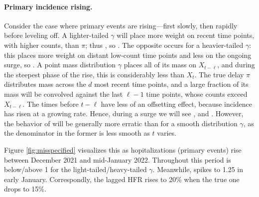 \documentclass{article}
\begin{document}
\paragraph{Primary incidence rising.} 

Consider the case where primary events are rising---first slowly, then rapidly
before leveling off. A lighter-tailed $\gamma$ will place more weight
on recent time points, with higher counts, than $\pi$; thus , so . The opposite occurs for a heavier-tailed $\gamma$: this
places more weight on distant low-count time points and less on the ongoing
surge, so . A point mass distribution $\gamma$ places
all of its mass on $X_{t-\ell}$, and during the steepest phase of the rise, this
is considerably less than $X_t$. The true delay $\pi$ distributes mass across
the  $d$ most recent time points, and a large fraction of its mass will be
convolved against the last $\ell-1$ time points, whose counts exceed
$X_{t-\ell}$. The times before $t-\ell$ have less of an offsetting effect, 
because incidence has risen at a  growing rate. Hence, during a surge we will 
see , and . However, the behavior of  will be generally more
erratic than  for a smooth distribution $\gamma$, as the
denominator in the former is less smooth as $t$ varies. 

Figure \ref{fig:misspecified} visualizes this as hopitalizations (primary
events) rise between December 2021 and mid-January 2022. Throughout this period
 is below/above 1 for the light-tailed/heavy-tailed
$\gamma$. Meanwhile,  spikes to 1.25 in early January.  
Correspondly, the lagged HFR rises to 20\% when the true one drops to 15\%.    
\end{document}
